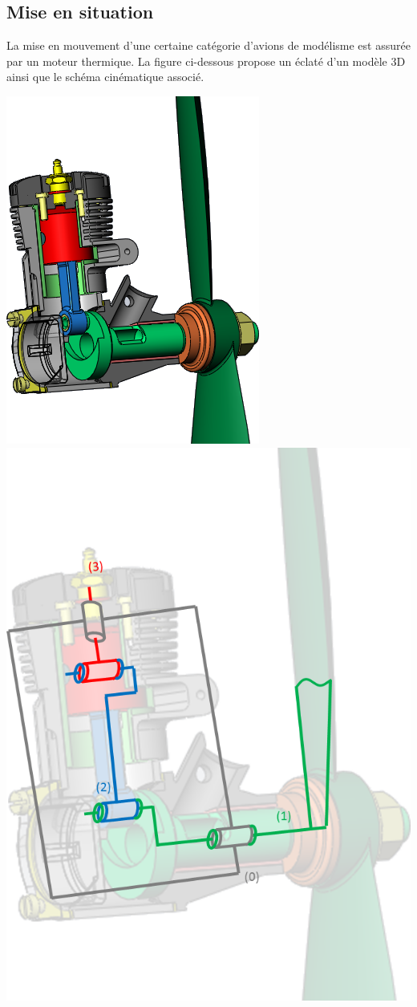 \documentclass[10pt,fleqn]{article} %
\begin{document}

\vspace{4cm}
\pagestyle{fancy}
\thispagestyle{plain}


\def\columnseprulecolor{\color{ocre}}
\setlength{\columnseprule}{0.4pt} 

\ifprof
\else
\begin{multicols}{2}
\fi
\section*{Mise en situation}
La mise en mouvement d'une certaine catégorie d'avions de modélisme est assurée par un moteur thermique.   La figure ci-dessous propose un éclaté d'un modèle 3D ainsi que le schéma cinématique associé. 

\begin{center}
\includegraphics[width=.45\linewidth]{images/fig_03}
\includegraphics[width=.45\linewidth]{images/fig_04}
\end{center}


\end{multicols}
\end{document}
